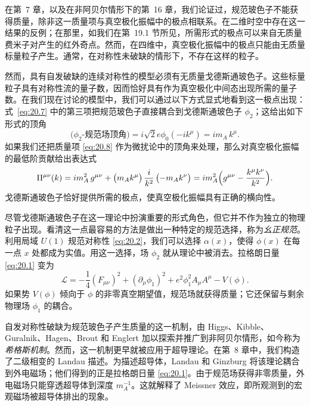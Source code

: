 在第~7 章，以及在非阿贝尔情形下的第~16 章，我们论证过，规范玻色子不能获得质量，除非这一质量项与真空极化振幅中的极点相联系。在二维时空中存在这一结果的反例；在那里，如我们在第~19.1 节所见，所需形式的极点可以来自无质量费米子对产生的红外奇点。然而，在四维中，真空极化振幅中的极点只能由无质量标量粒子产生。通常，在对称性未破缺的情形下，不存在这样的粒子。

然而，具有自发破缺的连续对称性的模型必须有无质量戈德斯通玻色子。这些标量粒子具有对称性流的量子数，因而恰好具有作为真空极化中间态出现所需的量子数。在我们现在讨论的模型中，我们可以通过以下方式显式地看到这一极点出现：式~\eqref{eq:20.7} 中的第三项把规范玻色子直接耦合到戈德斯通玻色子 $\phi_2$；这给出如下形式的顶角
\begin{equation}
  \text{($\phi_2$-规范场顶角)} = i\sqrt{2}e\phi_0(-ik^\mu)
  = im_A\,k^\mu .
  \label{eq:20.10}
\end{equation}
如果我们还把质量项 \eqref{eq:20.8} 作为微扰论中的顶角来处理，那么对真空极化振幅的最低阶贡献给出表达式
\begin{equation}
  \Pi^{\mu\nu}(k) = im_A^2\,g^{\mu\nu} + \bigl( m_A k^\mu \bigr)\,
    \frac{i}{k^2}\,\bigl( -m_A k^\nu \bigr)
  = im_A^2\Bigl( g^{\mu\nu} - \frac{k^\mu k^\nu}{k^2} \Bigr) .
  \label{eq:20.11}
\end{equation}
戈德斯通玻色子恰好提供所需的极点，使真空极化振幅具有正确的横向性。

尽管戈德斯通玻色子在这一理论中扮演重要的形式角色，但它并不作为独立的物理粒子出现。看清这一点最容易的方法是做出一种特定的规范选择，称为\emph{幺正规范}。利用局域 $U(1)$ 规范对称性 \eqref{eq:20.2}，我们可以选择 $\alpha(x)$，使得 $\phi(x)$ 在每一点 $x$ 处都成为实值。用这一选择，场 $\phi_2$ 就从理论中被消去。拉格朗日量 \eqref{eq:20.1} 变为
\begin{equation}
  \mathcal{L} = -\frac{1}{4}(F_{\mu\nu})^2 + (\partial_\mu\phi_1)^2
    + e^2\phi_1^2A_\mu A^\mu - V(\phi) .
  \label{eq:20.12}
\end{equation}
如果势 $V(\phi)$ 倾向于 $\phi$ 的非零真空期望值，规范场就获得质量；它还保留与剩余物理场 $\phi_1$ 的耦合。

自发对称性破缺为规范玻色子产生质量的这一机制，由 Higgs、Kibble、Guralnik、Hagen、Brout 和 Englert 加以探索并推广到非阿贝尔情形，如今称为\emph{希格斯机制}。然而，这一机制更早就被应用于超导理论。在第~8 章中，我们构造了二级相变的 Landau 描述。为描述超导体，Landau 和 Ginzburg 将该理论耦合到外电磁场；他们得到的正是拉格朗日量 \eqref{eq:20.1}。由于规范场获得非零质量，外电磁场只能穿透超导体到深度 $m_A^{-1}$。这就解释了 Meissner 效应，即所观测到的宏观磁场被超导体排出的现象。

